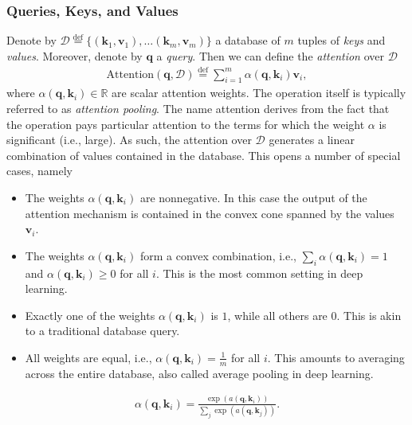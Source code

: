 \documentclass[a4paper,12pt]{article}
\theoremstyle{definition}
\begin{document}
    \subsubsection*{Queries, Keys, and Values}
    Denote by $\mathcal{D} \stackrel{\mathrm{def}}{=} \{(\mathbf{k}_1, \mathbf{v}_1), \ldots (\mathbf{k}_m, \mathbf{v}_m)\}$ a database of $m$ tuples of \emph{keys} and \emph{values}. 
    Moreover, denote by $\mathbf{q}$ a \emph{query}. Then we can define the \emph{attention} over $\mathcal{D}$
    \begin{equation*}
        \begin{aligned}
            \mathrm{Attention}(\mathbf{q}, \mathcal{D}) \stackrel{\mathrm{def}}{=} \sum_{i=1}^m \alpha(\mathbf{q}, \mathbf{k}_i) \mathbf{v}_i,
        \end{aligned}
    \end{equation*}
    where $\alpha(\mathbf{q}, \mathbf{k}_i) \in \mathbb{R}$ are scalar attention weights. The operation itself is typically referred to as \emph{attention pooling}.  
    The name attention derives from the fact that the operation pays particular attention to the terms for which the weight $\alpha$ is significant (i.e., large). 
    As such, the attention over $\mathcal{D}$ generates a linear combination of values contained in the database. This opens a number of special cases, namely
    \begin{itemize}
        \item The weights $\alpha(\mathbf{q}, \mathbf{k}_i)$ are nonnegative. In this case the output of the attention mechanism is contained in the convex cone spanned by the values $\mathbf{v}_i$.
        \item The weights $\alpha(\mathbf{q}, \mathbf{k}_i)$ form a convex combination, i.e., $\sum_i \alpha(\mathbf{q}, \mathbf{k}_i) = 1$ and $\alpha(\mathbf{q}, \mathbf{k}_i) \geq 0$ for all $i$. 
        This is the most common setting in deep learning.
        \item Exactly one of the weights $\alpha(\mathbf{q}, \mathbf{k}_i)$ is $1$, while all others are $0$. This is akin to a traditional database query.
        \item All weights are equal, i.e., $\alpha(\mathbf{q}, \mathbf{k}_i) = \frac{1}{m}$ for all $i$. This amounts to averaging across the entire database, also called average pooling in deep learning.
    \end{itemize}
    \begin{equation*}
        \begin{aligned}
            \alpha(\mathbf{q}, \mathbf{k}_i) = \frac{\exp(a(\mathbf{q}, \mathbf{k}_i))}{\sum_j \exp(a(\mathbf{q}, \mathbf{k}_j))}.
        \end{aligned}
    \end{equation*}
\end{document}
